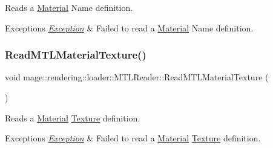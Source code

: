Reads a \mbox{\hyperlink{classmage_1_1rendering_1_1_material}{Material}} Name definition.


\begin{DoxyExceptions}{Exceptions}
{\em \mbox{\hyperlink{classmage_1_1_exception}{Exception}}} & Failed to read a \mbox{\hyperlink{classmage_1_1rendering_1_1_material}{Material}} Name definition. \\
\hline
\end{DoxyExceptions}
\mbox{\label{classmage_1_1rendering_1_1loader_1_1_m_t_l_reader_a62b4c2d4106fb11f55af6a7de29ad37a}} 
\subsubsection{\texorpdfstring{Read\+M\+T\+L\+Material\+Texture()}{ReadMTLMaterialTexture()}}
{\footnotesize\ttfamily void mage\+::rendering\+::loader\+::\+M\+T\+L\+Reader\+::\+Read\+M\+T\+L\+Material\+Texture (\begin{DoxyParamCaption}{ }\end{DoxyParamCaption})\hspace{0.3cm}{\ttfamily [private]}}

Reads a \mbox{\hyperlink{classmage_1_1rendering_1_1_material}{Material}} \mbox{\hyperlink{classmage_1_1rendering_1_1_texture}{Texture}} definition.


\begin{DoxyExceptions}{Exceptions}
{\em \mbox{\hyperlink{classmage_1_1_exception}{Exception}}} & Failed to read a \mbox{\hyperlink{classmage_1_1rendering_1_1_material}{Material}} \mbox{\hyperlink{classmage_1_1rendering_1_1_texture}{Texture}} definition. \\
\hline
\end{DoxyExceptions}
\mbox{\label{classmage_1_1rendering_1_1loader_1_1_m_t_l_reader_a14aa8cd5655730234c460c6060552f68}} 
